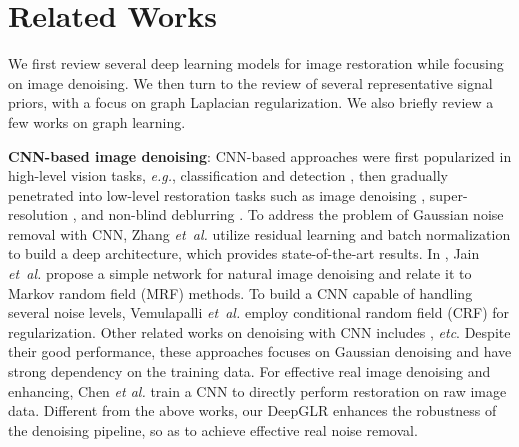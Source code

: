 \documentclass[10pt,twocolumn,letterpaper]{article}
\newcommand{\blue}[1]{\textcolor[rgb]{0.0,0.0,1.0}{{#1}}}
\begin{document}
\section{Related Works}\label{sec:related}
%
We first review several deep learning models for image restoration while focusing on image denoising.
We then turn to the review of several representative signal priors, with a focus on graph Laplacian regularization. 
We also briefly review a few works on graph learning.


\textbf{CNN-based image denoising}:
CNN-based approaches were first popularized in high-level vision tasks, {\it e.g.}, classification \cite{krizhevsky2012imagenet} and detection \cite{ouyang2013joint}, then gradually penetrated into low-level restoration tasks such as image denoising \cite{zhang2017beyond}, super-resolution \cite{dong2014learning}, and non-blind deblurring \cite{xu2014deep}. 
To address the problem of Gaussian noise removal with CNN, Zhang {\it et~al.} \cite{zhang2017beyond} utilize residual learning and batch normalization to build a deep architecture, which provides state-of-the-art results.
In \cite{jain2009natural}, Jain {\it et~al.} propose a simple network for natural image denoising and relate it to Markov random field (MRF) methods. 
To build a CNN capable of handling several noise levels, Vemulapalli {\it et~al.} \cite{vemulapalli2016deep} employ conditional random field (CRF) for regularization. 
Other related works on denoising with CNN includes \cite{mao2016image,tai2017memnet,zhang2018ffdnet}, {\it etc}.
Despite their good performance, these approaches focuses on Gaussian denoising and have strong dependency on the training data. 
For effective real image denoising and enhancing, Chen {\it et al.} \cite{chen2018learning} train a CNN to directly  perform restoration on raw image data.
Different from the above works, our DeepGLR enhances the robustness of the denoising pipeline, so as to achieve effective real noise removal.
\end{document}
